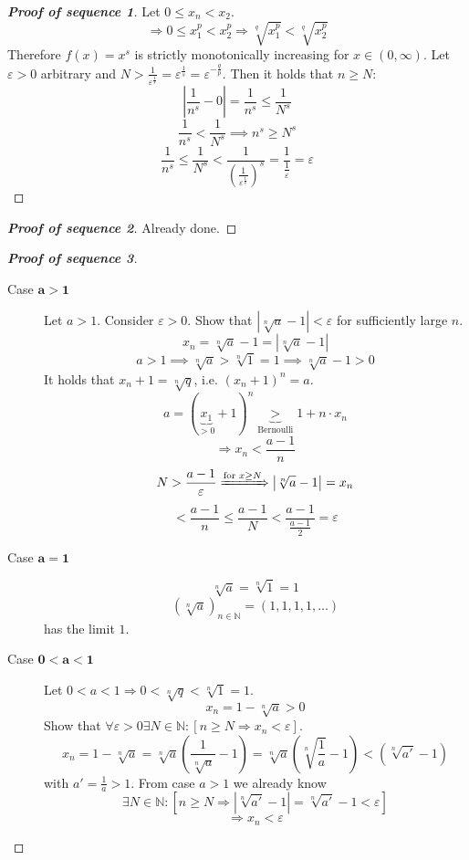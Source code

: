 \documentclass[a4paper,landscape,twocolumn]{article}
\theoremstyle{definition}
\newcommand\abs[1]{\left|#1\right|}
\begin{document}
\begin{proof}[\textbf{Proof of sequence 1}]
  Let $0 \leq x_n < x_2$.
  \[ \Rightarrow 0 \leq x_1^p < x_2^p \Rightarrow \sqrt[q]{x_1^p} < \sqrt[q]{x_2^p} \]
  Therefore $f(x) = x^s$ is strictly monotonically increasing for $x \in (0, \infty)$.
  Let $\varepsilon > 0$ arbitrary and $N > \frac1{\varepsilon^{\frac1s}} = \varepsilon^{\frac1s} = \varepsilon^{-\frac qp}$.
  Then it holds that $n \geq N$:
  \[ \abs{\frac1{n^s} - 0} = \frac{1}{n^s} \leq \frac{1}{N^s} \]
  \[ \frac{1}{n^s} < \frac{1}{N^s} \implies n^s \geq N^s \]
  \[
      \frac{1}{n^s} \leq \frac{1}{N^s} < \frac{1}{\left(\frac{1}{\varepsilon^{\frac1s}}\right)^s}
      = \frac{1}{\frac1\varepsilon}
      = \varepsilon
  \]
\end{proof}

\begin{proof}[\textbf{Proof of sequence 2}]
  Already done.
\end{proof}

\begin{proof}[\textbf{Proof of sequence 3}]
  \begin{description}
    \item[Case $\mathbf{a > 1}$]
      Let $a > 1$. Consider $\varepsilon > 0$.
      Show that $\abs{\sqrt[n]{a} - 1} < \varepsilon$ for sufficiently large $n$.
      \[ x_n = \sqrt[n]{a} - 1 = \abs{\sqrt[n]{a} - 1} \]
      \[ a > 1 \implies \sqrt[n]{a} > \sqrt[n]{1} = 1 \implies \sqrt[n]{a} - 1 > 0 \]
      It holds that $x_n + 1 = \sqrt[n]{q}$, i.e. $(x_n + 1)^n = a$.
      \[ a = (\underbrace{x_1}_{> 0} + 1)^n \underbrace{>}_{\text{Bernoulli}} 1 + n \cdot x_n \]
      \[ \Rightarrow x_n < \frac{a - 1}{n} \]
      \[ N > \frac{a - 1}{\varepsilon} \xRightarrow{\text{for } x \geq N} \abs{\sqrt[n]{a} - 1} = x_n \]
      \[ < \frac{a - 1}{n} \leq \frac{a - 1}{N} < \frac{a - 1}{\frac{a - 1}{2}} = \varepsilon \]
    \item[Case $\mathbf{a = 1}$]
      \[ \sqrt[n]{a} = \sqrt[n]{1} = 1 \]
      \[ \left(\sqrt[n]{a}\right)_{n \in \mathbb N} = (1, 1, 1, 1, \dots) \]
      has the limit $1$.
    \item[Case $\mathbf{0 < a < 1}$]
      Let $0 < a < 1 \Rightarrow 0 < \sqrt[n]{q} < \sqrt[n]{1} = 1$.
      \[ x_n = 1 - \sqrt[n]{a} > 0 \]
      Show that $\forall \varepsilon > 0 \exists N \in \mathbb N: \left[n \geq N \Rightarrow x_n < \varepsilon\right]$.
      \[
          x_n
          = 1 - \sqrt[n]{a} = \sqrt[n]{a} \left(\frac{1}{\sqrt[n]{a}} - 1\right)
          = \sqrt[n]{a} \left(\sqrt[n]{\frac1a} - 1\right) < \left(\sqrt[n]{a'} - 1\right)
      \]
      with $a' = \frac1a > 1$.
      From case $a > 1$ we already know
      \[ \exists N \in \mathbb N: \left[n \geq N \Rightarrow \abs{\sqrt[n]{a'} - 1} = \sqrt[n]{a'} - 1 < \varepsilon\right] \]
      \[ \Rightarrow x_n < \varepsilon \]
  \end{description}
\end{proof}
\end{document}
